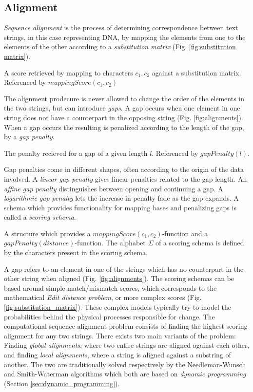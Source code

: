 \documentclass[thesis.tex]{subfiles}
\begin{document}
\subsection{Alignment}
\textit{Sequence alignment} is the process of determining correspondence between text strings, in this case representing DNA, by mapping the elements from one to the elements of the other according to a \textit{substitution matrix} (Fig. \ref{fig:substitution matrix}).
\begin{defn}
  A score retrieved by mapping to characters $c_1, c_2$ against a substitution matrix. Referenced by $mappingScore(c_1, c_2)$
\end{defn}
The alignment prodecure is never allowed to change the order of the elements in the two strings, but can introduce \textit{gaps}. A gap occurs when one element in one string does not have a counterpart in the opposing string (Fig. \ref{fig:alignments}). When a gap occurs the resulting is penalized according to the length of the gap, by a \textit{gap penalty}. 
\begin{defn}
  The penalty recieved for a gap of a given length $l$. Referenced by $gapPenalty(l)$.
\end{defn}
Gap penalties come in different shapes, often according to the origin of the data involved. A \textit{linear gap penalty} gives linear penalties related to the gap length. An \textit{affine gap penalty} distinguishes between opening and continuing a gap. A \textit{logarithmic gap penalty} lets the increase in penalty fade as the gap expands. A schema which provides functionality for mapping bases and penalizing gaps is called a \textit{scoring schema}.
\begin{defn}
\label{def:scoring_schema}
A structure which provides a $mappingScore(c_1, c_2)$-function and a $gapPenalty(distance)$-function. The alphabet $\Sigma$ of a scoring schema is defined by the characters present in the scoring schema.
\end{defn}
A gap refers to an element in one of the strings which has no counterpart in the other string when aligned (Fig. \ref{fig:alignments}). The scoring schemas can be based around simple match/mismatch scores, which corresponds to the mathematical \textit{Edit distance problem}, or more complex scores (Fig. \ref{fig:substitution_matrix}). These complex models typically try to model the probabilities behind the physical processes responsible for change. The computational sequence alignment problem consists of finding the highest scoring alignment for any two strings. There exists two main variants of the problem: Finding  \textit{global alignments}, where two entire strings are aligned against each other, and finding \textit{local alignments}, where a string is aligned against a substring of another. The two are traditionally solved respectively by the Needleman-Wunsch and Smith-Waterman algorithms which both are based on \textit{dynamic programming} (Section \ref{sec:dynamic_programming}).\\
\end{document}
